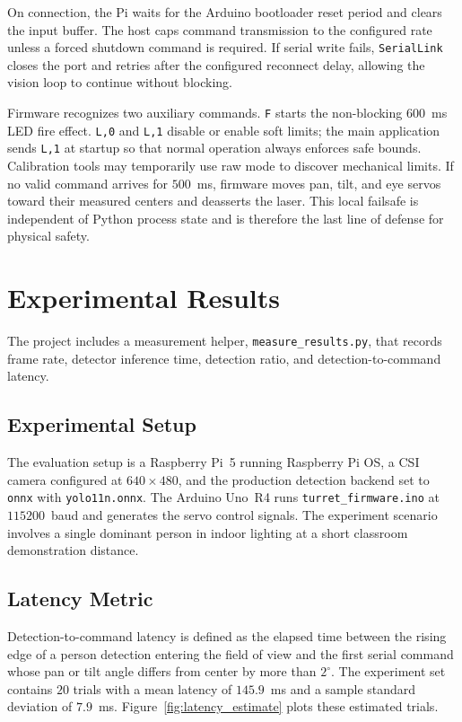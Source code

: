 \documentclass[lettersize,journal]{IEEEtran}
\begin{document}
On connection, the Pi waits for the Arduino bootloader reset period and clears the input buffer. The host caps command transmission to the configured rate unless a forced shutdown command is required. If serial write fails, \texttt{SerialLink} closes the port and retries after the configured reconnect delay, allowing the vision loop to continue without blocking.

Firmware recognizes two auxiliary commands. \texttt{F} starts the non-blocking $600$~ms LED fire effect. \texttt{L,0} and \texttt{L,1} disable or enable soft limits; the main application sends \texttt{L,1} at startup so that normal operation always enforces safe bounds. Calibration tools may temporarily use raw mode to discover mechanical limits. If no valid command arrives for $500$~ms, firmware moves pan, tilt, and eye servos toward their measured centers and deasserts the laser. This local failsafe is independent of Python process state and is therefore the last line of defense for physical safety.

\section{Experimental Results}
\label{sec:results}
The project includes a measurement helper, \texttt{measure\_results.py}, that records frame rate, detector inference time, detection ratio, and detection-to-command latency.

\subsection{Experimental Setup}
The evaluation setup is a Raspberry Pi~5 running Raspberry Pi OS, a CSI camera configured at $640\times480$, and the production detection backend set to \texttt{onnx} with \texttt{yolo11n.onnx}. The Arduino Uno~R4 runs \texttt{turret\_firmware.ino} at $115200$~baud and generates the servo control signals. The experiment scenario involves a single dominant person in indoor lighting at a short classroom demonstration distance.

\subsection{Latency Metric}
Detection-to-command latency is defined as the elapsed time between the rising edge of a person detection entering the field of view and the first serial command whose pan or tilt angle differs from center by more than $2^\circ$. The experiment set contains $20$ trials with a mean latency of $145.9$~ms and a sample standard deviation of $7.9$~ms. Figure~\ref{fig:latency_estimate} plots these estimated trials.
\end{document}
